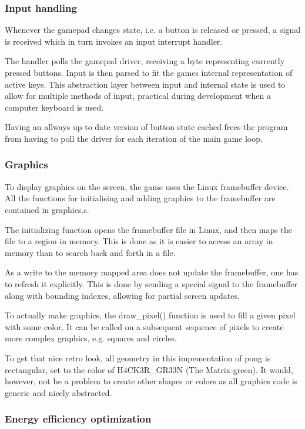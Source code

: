 \subsubsection{Input handling}
Whenever the gamepad changes state, i.e. a button is released or pressed,
a signal is received which in turn invokes an input interrupt handler.

The handler polls the gamepad driver, receiving a byte representing currently
pressed buttons. Input is then parsed to fit the games internal representation
of active keys. This abstraction layer between input and internal state is used
to allow for multiple methods of input, practical during development when a
computer keyboard is used.

Having an allways up to date version of button state cached frees the program
from having to poll the driver for each iteration of the main game loop.

\subsubsection{Graphics}
To display graphics on the screen, the game uses the Linux framebuffer device.
All the functions for initialising and adding graphics to the framebuffer are
contained in graphics.s.

The initializing function opens the framebuffer file in Linux, and then maps the
file to a region in memory. This is done as it is easier to access an array in memory
than to search back and forth in a file.

As a write to the memory mapped area does not update the framebuffer,
one has to refresh it explicitly.
This is done by sending a special signal to the framebuffer
along with bounding indexes, allowing for partial screen updates.

To actually make graphics,
the draw\_pixel() function is used to fill a given pixel with some color.
It can be called on a subsequent sequence of pixels to create more complex graphics,
e.g. squares and circles.

To get that nice retro look, all geometry in this impementation of pong is rectangular,
set to the color of H4CK3R\_GR33N (The Matrix-green).
It would, however, not be a problem to create other shapes or colors as
all graphics code is generic and nicely abstracted.

\subsubsection{Energy efficiency optimization}
